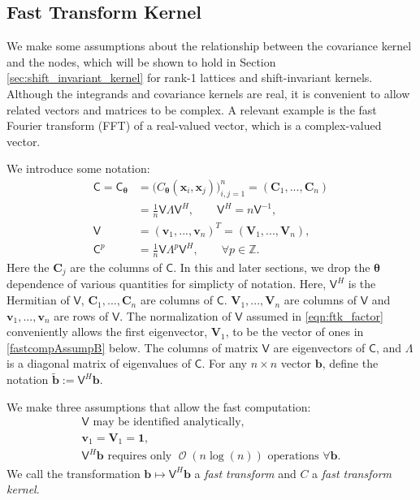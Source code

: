 \documentclass[twocolumn]{svjour3}          %
\DeclareMathOperator{\Order}{{\mathcal O}}
\newcommand{\bm}[1]{\boldsymbol{#1}}
\newcommand{\integers}{\mathbb{Z}}
\newcommand{\vtheta}{{\bm{\theta}}}
\newcommand{\vb}{\bm{b}}
\newcommand{\vC}{\bm{C}}
\newcommand{\vv}{\bm{v}}
\newcommand{\vV}{\bm{V}}
\newcommand{\vx}{\bm{x}}
\newcommand{\vone}{\bm{1}}
\newcommand{\mC}{\mathsf{C}}
\newcommand{\mLambda}{\mathsf{\Lambda}}
\newcommand{\mV}{\mathsf{V}}
\begin{document}
\subsection{Fast Transform Kernel}
We make some assumptions about the relationship between the covariance kernel and the nodes, which will be shown to hold in Section \ref{sec:shift_invariant_kernel} for rank-1 lattices and shift-invariant kernels.  Although the integrands and covariance kernels are real, it is convenient to allow related vectors and matrices to be complex.  A relevant example is the fast Fourier transform (FFT) of a real-valued vector, which is a complex-valued vector. 

We introduce some notation:
\begin{align}
\nonumber
\mC = \mC_\vtheta &= \Big(C_\vtheta(\vx_i,\vx_j)\Big)_{i,j=1}^n  = (\vC_1,...,\vC_n) 
\\
\label{eqn:ftk_factor}
&= \frac 1n \mV \mLambda \mV^H , 
\quad \quad \mV^H = n \mV^{-1}, \\
\nonumber
\mV &= (\vv_1,...,\vv_n)^T = (\vV_1,...,\vV_n), \\
\nonumber
\mC^p  &= \frac 1n \mV \mLambda^{p} \mV^H, \qquad \forall p \in \integers.
\end{align}
Here the $\vC_j$ are the columns of $\mC$.  In this and later sections, we drop the $\vtheta$ dependence of various quantities for simplicty of notation.  Here, $\mV^H$ is the Hermitian of $\mV$, $\vC_1,...,\vC_n$ are columns of $\mC$.  $\vV_1,...,\vV_n$ are columns of $\mV$ and $\vv_1,...,\vv_n$ are rows of $\mV$.  The normalization of $\mV$ assumed in \eqref{eqn:ftk_factor} conveniently allows the first eigenvector, $\vV_1$, to be the vector of ones in \eqref{fastcompAssumpB} below.  The columns of matrix $\mV$ are eigenvectors of $\mC$, and $\mLambda$ is a diagonal matrix of eigenvalues of $\mC$.
For any $n \times n$ vector $\vb$, define the notation  $\widetilde{\vb} := \mV^H \vb$.

We make three assumptions that allow the fast computation:
\begin{subequations} \label{fastcompAssump}
	\begin{gather}
	\label{fastcompAssumpA}
	\mV \text{ may be identified analytically}, \\
	\label{fastcompAssumpB}
	\vv_1 = \vV_1 = \vone, \\
	\label{fastcompAssumpC}
	\mV^H \vb  \text{ requires only $\Order(n \log(n))$ operations } \forall \vb.
	\end{gather}
\end{subequations}
We call the transformation $\vb \mapsto \mV^H \vb$ a \emph{fast transform} and $C$ a \emph{fast transform kernel}.  
\end{document}
